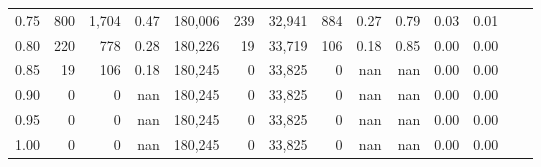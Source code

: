 \begin{tabular}{rrrrrrrrrrrrrr}
0.75 &     800 &  1,704 &    0.47 &  180,006 &      239 &  32,941 &     884 &  0.27 &  0.79 &  0.03 &      0.01 \\
0.80 &     220 &    778 &    0.28 &  180,226 &       19 &  33,719 &     106 &  0.18 &  0.85 &  0.00 &      0.00 \\
0.85 &      19 &    106 &    0.18 &  180,245 &        0 &  33,825 &       0 &   nan &   nan &  0.00 &      0.00 \\
0.90 &       0 &      0 &     nan &  180,245 &        0 &  33,825 &       0 &   nan &   nan &  0.00 &      0.00 \\
0.95 &       0 &      0 &     nan &  180,245 &        0 &  33,825 &       0 &   nan &   nan &  0.00 &      0.00 \\
1.00 &       0 &      0 &     nan &  180,245 &        0 &  33,825 &       0 &   nan &   nan &  0.00 &      0.00 \\
\bottomrule
\end{tabular}
